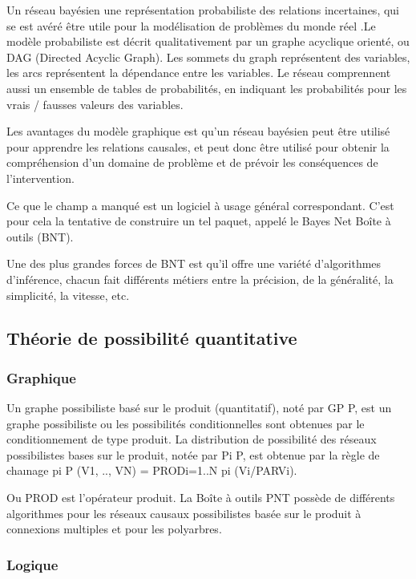 Un réseau bayésien une représentation probabiliste des relations incertaines, qui se est avéré être utile pour la modélisation de problèmes du monde réel .Le modèle probabiliste est décrit qualitativement par un graphe acyclique orienté, ou DAG (Directed Acyclic Graph). Les sommets du graph représentent des variables, les arcs représentent la dépendance entre les variables. Le réseau comprennent aussi un ensemble de tables de probabilités, en indiquant les probabilités pour les vrais / fausses valeurs des variables.

Les avantages du  modèle graphique est qu’un réseau bayésien peut être utilisé pour apprendre les relations causales, et peut donc être utilisé pour obtenir la compréhension d'un domaine de problème et de prévoir les conséquences de l'intervention.

Ce que le champ a manqué est un logiciel à usage général correspondant. C’est pour cela la tentative de construire un tel paquet, appelé le Bayes Net Boîte à outils (BNT).

Une des plus grandes forces de BNT est qu'il offre une variété d'algorithmes d'inférence, chacun fait différents métiers entre la précision, de la généralité, la simplicité, la vitesse, etc.


\subsection{Théorie de possibilité quantitative}

\subsubsection{Graphique}

Un graphe possibiliste basé sur le produit (quantitatif), noté par GP P, est un graphe possibiliste ou les possibilités conditionnelles sont obtenues par le conditionnement de type produit. La distribution de possibilité des réseaux possibilistes bases sur le produit, notée par Pi P, est obtenue par la règle de chaınage 
pi P (V1, .., VN) = PRODi=1..N pi (Vi/PARVi).
 	
Ou PROD est l’opérateur produit.
La Boîte à outils PNT possède de différents algorithmes pour les réseaux causaux possibilistes basée sur le produit à connexions multiples et pour les polyarbres. 
\subsubsection{Logique}

